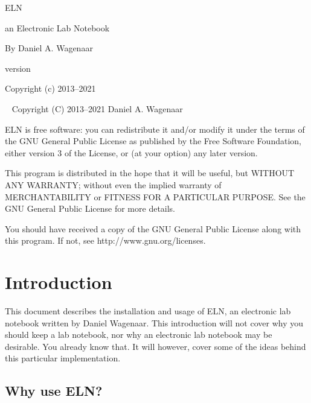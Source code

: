 \documentclass[11pt]{report}
\begin{document}
\thispagestyle{empty}
\begin{centering}
  {\Huge ELN}
  \vskip30pt

  {\Large an Electronic Lab Notebook}
  \vskip60pt

 
  {\large By Daniel A. Wagenaar}
  \vfill  

{\large version {}} 
\vskip10pt
  
  
  {Copyright (c) 2013--2021}
  
\end{centering}
\pagebreak
~
\vfill
\noindent Copyright (C) 2013--2021 Daniel A. Wagenaar\medskip

ELN is free software: you can redistribute it and/or modify
it under the terms of the GNU General Public License as published by
the Free Software Foundation, either version 3 of the License, or
(at your option) any later version.

This program is distributed in the hope that it will be useful,
but WITHOUT ANY WARRANTY; without even the implied warranty of
MERCHANTABILITY or FITNESS FOR A PARTICULAR PURPOSE.  See the
GNU General Public License for more details.

You should have received a copy of the GNU General Public License
along with this program.  If not, see http://www.gnu.org/licenses.
\pagebreak

\tableofcontents
\pagebreak

\chapter{Introduction}

This document describes the installation and usage of ELN, an
electronic lab notebook written by Daniel Wagenaar.  This introduction
will not cover why you should keep a lab notebook, nor why an
electronic lab notebook may be desirable. You already know that.  It
will however, cover some of the ideas behind this particular
implementation.

\section{Why use ELN?}
\end{document}
